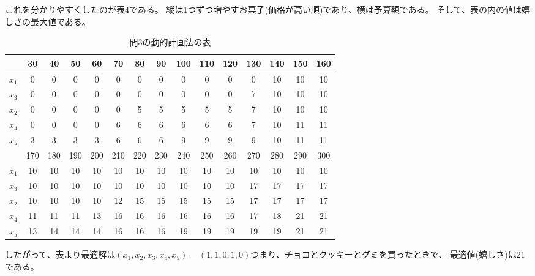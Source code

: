\documentclass[12pt]{jarticle}
\begin{document}
これを分かりやすくしたのが表4である。
縦は1つずつ増やすお菓子(価格が高い順)であり、横は予算額である。
そして、表の内の値は嬉しさの最大値である。
\begin{table}[htb]
    \begin{center}
        \caption{問3の動的計画法の表}
        \begin{tabular}{|c|c|c|c|c|c|c|c|c|c|c|c|c|c|c|}
            \hline
                  & 30  & 40  & 50  & 60  & 70  & 80  & 90  & 100 & 110 & 120 & 130 & 140 & 150 & 160 \\
            \hline
            $x_1$ & 0   & 0   & 0   & 0   & 0   & 0   & 0   & 0   & 0   & 0   & 0   & 10  & 10  & 10  \\ \hline
            $x_3$ & 0   & 0   & 0   & 0   & 0   & 0   & 0   & 0   & 0   & 0   & 7   & 10  & 10  & 10  \\ \hline
            $x_2$ & 0   & 0   & 0   & 0   & 0   & 5   & 5   & 5   & 5   & 5   & 7   & 10  & 10  & 10  \\ \hline
            $x_4$ & 0   & 0   & 0   & 0   & 6   & 6   & 6   & 6   & 6   & 6   & 7   & 10  & 11  & 11  \\ \hline
            $x_5$ & 3   & 3   & 3   & 3   & 6   & 6   & 6   & 9   & 9   & 9   & 9   & 10  & 11  & 11  \\
            \hline
            \hline
                  & 170 & 180 & 190 & 200 & 210 & 220 & 230 & 240 & 250 & 260 & 270 & 280 & 290 & 300 \\
            \hline
            $x_1$ & 10  & 10  & 10  & 10  & 10  & 10  & 10  & 10  & 10  & 10  & 10  & 10  & 10  & 10  \\ \hline
            $x_3$ & 10  & 10  & 10  & 10  & 10  & 10  & 10  & 10  & 10  & 10  & 17  & 17  & 17  & 17  \\ \hline
            $x_2$ & 10  & 10  & 10  & 10  & 12  & 15  & 15  & 15  & 15  & 15  & 17  & 17  & 17  & 17  \\ \hline
            $x_4$ & 11  & 11  & 11  & 13  & 16  & 16  & 16  & 16  & 16  & 16  & 17  & 18  & 21  & 21  \\ \hline
            $x_5$ & 13  & 14  & 14  & 14  & 16  & 16  & 16  & 19  & 19  & 19  & 19  & 19  & 21  & 21  \\
            \hline
        \end{tabular}
    \end{center}
\end{table}

したがって、表より最適解は$(x_1,x_2,x_3,x_4,x_5)=(1,1,0,1,0)$つまり、チョコとクッキーとグミを買ったときで、
最適値(嬉しさ)は21である。
\end{document}
